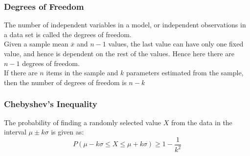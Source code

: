 \documentclass{article}
\theoremstyle{plain}
\theoremstyle{definition}
\begin{document}
\subsubsection{Degrees of Freedom}
The number of independent variables in a model, or independent observations in a data set is called the degrees of freedom.\\
Given a sample mean $\overline{x}$ and $n-1$ values, the last value can have only one fixed value, and hence is dependent on the rest of the values. Hence here there are $n-1$ degrees of freedom.\\
If there are $n$ items in the sample and $k$ parameters estimated from the sample, then the number of degrees of freedom is $n-k$

\subsubsection{Chebyshev's Inequality}
The probability of finding a randomly selected value $X$ from the data in the interval $\mu \pm  k \sigma$ is given as:
\begin{equation}
    P(\mu - k\sigma \leq X \leq \mu + k\sigma ) \geq 1 - \frac{1}{k^2}
\end{equation}
\end{document}
